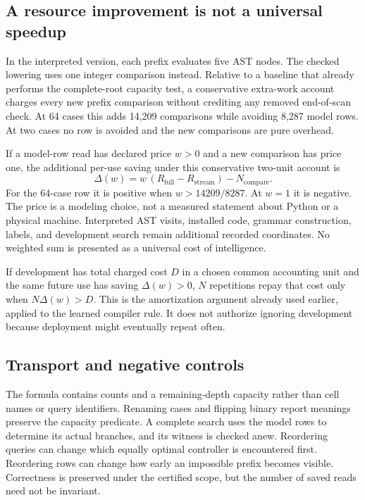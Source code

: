\subsection{A resource improvement is not a universal speedup}
In the interpreted version, each prefix evaluates five AST nodes. The checked lowering uses one integer comparison instead. Relative to a baseline that already performs the complete-root capacity test, a conservative extra-work account charges every new prefix comparison without crediting any removed end-of-scan check. At 64 cases this adds 14,209 comparisons while avoiding 8,287 model rows. At two cases no row is avoided and the new comparisons are pure overhead.

If a model-row read has declared price $w>0$ and a new comparison has price one, the additional per-use saving under this conservative two-unit account is
\[
\Delta(w)=w\,(R_{\mathrm{full}}-R_{\mathrm{stream}})-N_{\mathrm{compare}}.
\]
For the 64-case row it is positive when $w>14209/8287$. At $w=1$ it is negative. The price is a modeling choice, not a measured statement about Python or a physical machine. Interpreted AST visits, installed code, grammar construction, labels, and development search remain additional recorded coordinates. No weighted sum is presented as a universal cost of intelligence.

If development has total charged cost $D$ in a chosen common accounting unit and the same future use has saving $\Delta(w)>0$, $N$ repetitions repay that cost only when $N\Delta(w)>D$. This is the amortization argument already used earlier, applied to the learned compiler rule. It does not authorize ignoring development because deployment might eventually repeat often.

\subsection{Transport and negative controls}
The formula contains counts and a remaining-depth capacity rather than cell names or query identifiers. Renaming cases and flipping binary report meanings preserve the capacity predicate. A complete search uses the model rows to determine its actual branches, and its witness is checked anew. Reordering queries can change which equally optimal controller is encountered first. Reordering rows can change how early an impossible prefix becomes visible. Correctness is preserved under the certified scope, but the number of saved reads need not be invariant.

